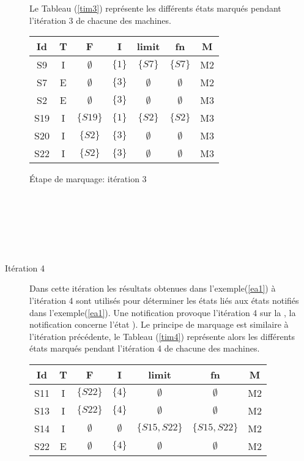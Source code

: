 \begin{Exemple}
\begin{description}
Le Tableau (\ref{tim3}) représente les différents états marqués pendant l'itération 3 de chacune des machines. 
	\begin{tableth}
	\centering
	\begin{tabular}{|*{7}{c|}}
		\hline
		Id&		T&			F&	I&	limit&	fn&		M\\
		\hline
		S9&	I&	$\emptyset$&	$\{1\}$&	$\{S7\}$   &	$\{S7\}$&	M2\\ \hline
		S7&	E&	$\emptyset$&	$\{3\}$&	$\emptyset$& $\emptyset$&	M2\\ \hline
		S2&	E&	$\emptyset$&	$\{3\}$&$\emptyset$& $\emptyset$	&	M3\\ \hline
		S19&I&	$\{S19\}$&	$\{1\}$&$\{S2\}$   & $\{S2\}$	&	M3\\ \hline
		S20&I&	$\{S2\}$&	$\{3\}$&$\emptyset$& $\emptyset$&	M3\\ \hline
		S22&I&	$\{S2\}$&	$\{3\}$&$\emptyset$& $\emptyset$&	M3\\ \hline
		
	\end{tabular}
	\caption{Étape de marquage: itération 3}\label{tim3}
\end{tableth}
\\\\\\\\\\
	\item[Itération 4] Dans cette itération les résultats obtenues dans l'exemple(\ref{ea1}) à l'itération 4 sont utilisés pour déterminer les états liés aux états notifiés dans l'exemple(\ref{ea1}). Une notification provoque l'itération 4 sur la \mtwo{}, la notification concerne l'état ). Le principe de marquage est similaire à l'itération précédente, le Tableau (\ref{tim4}) représente alors les différents états marqués pendant l'itération 4 de chacune des machines. 
	\begin{tableth}
	\centering
	\begin{tabular}{|*{7}{c|}}
		\hline
		Id&		T&			F&	I&	limit&	fn&		M\\
		\hline
		S11&	I&	$\{S22\}$	&	$\{4\}$			&$\emptyset$	&$\emptyset$	&M2\\ \hline
		S13&	I&	$\{S22\}$	&	$\{4\}$			&$\emptyset$	&$\emptyset$	&M2\\ \hline
		S14&	I&	$\emptyset$	&$\emptyset$	&	$\{S15,S22\}$	&$\{S15,S22\}$	&M2\\ \hline
		S22&	E&	$\emptyset$	&	$\{4\}$			&$\emptyset$	&$\emptyset$	&M2\\ \hline
		

\end{tabular}
\end{tableth}
\end{description}
\end{Exemple}
